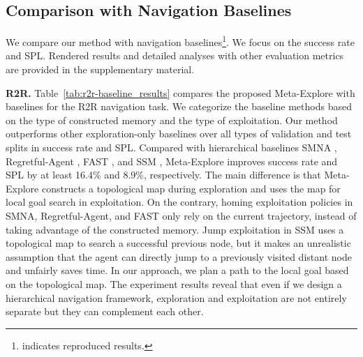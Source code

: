 \documentclass[10pt,twocolumn,letterpaper]{article}
\begin{document}
\subsection{Comparison with Navigation Baselines}
\vspace{-0.15cm}
We compare our method with navigation baselines\footnote{ indicates reproduced results.}. We focus on the success rate and SPL. Rendered results and detailed analyses with other evaluation metrics are provided in the supplementary material.

\noindent\textbf{R2R.}
Table~\ref{tab:r2r-baseline_results} compares the proposed Meta-Explore with baselines for the R2R navigation task. We categorize the baseline methods based on the type of constructed memory and the type of exploitation. Our method outperforms other exploration-only baselines over all types of validation and test splits in success rate and SPL. Compared with hierarchical baselines SMNA \cite{ma2019self}, Regretful-Agent \cite{ma2019regretful}, FAST \cite{ke2019tactical}, and SSM \cite{Wang_2021_CVPR-structured-scene}, Meta-Explore improves success rate and SPL by at least 16.4\% and 8.9\%, respectively. The main difference is that Meta-Explore constructs a topological map during exploration and uses the map for local goal search in exploitation. On the contrary, homing exploitation policies in SMNA, Regretful-Agent, and FAST only rely on the current trajectory, instead of taking advantage of the constructed memory. Jump exploitation in SSM uses a topological map to search a successful previous node, but it makes an unrealistic assumption that the agent can directly jump to a previously visited distant node and unfairly saves time. In our approach, we plan a path to the local goal based on the topological map. The experiment results reveal that even if we design a hierarchical navigation framework, exploration and exploitation are not entirely separate but they can complement each other.
\end{document}
